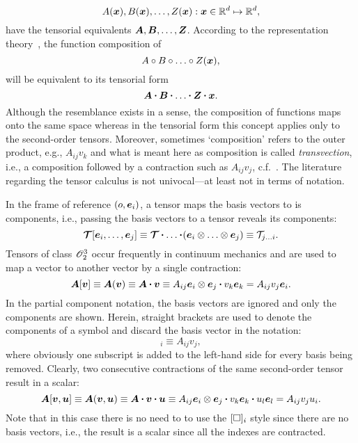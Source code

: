 \begin{equation}
A(\tena{x}), B(\tena{x}),\ldots, Z(\tena{x}): \tena{x}\in\Real^d \mapsto \Real^d,
\end{equation}
have the tensorial equivalents $\tenb{A}, \tenb{B},\ldots,\tenb{Z}$. According to the representation theory~\autocite{Brannon.2017}, the function composition of
\begin{equation}
A\circ B\circ \ldots \circ Z(\tena{x}),
\end{equation}
will be equivalent to its tensorial form
\begin{equation}
\tenb{A}\scp \tenb{B}\scp \ldots \scp \tenb{Z}\scp \tena{x}.
\end{equation}
Although the resemblance exists in a sense, the composition of functions maps onto the same space whereas in the tensorial form this concept applies only to the second-order tensors. Moreover, sometimes `composition' refers to the outer product, e.g., $A_{ij}v_k$ and what is meant here as composition is called \textit{transvection}, i.e., a composition followed by a contraction such as $A_{ij}v_j$, c.f.~\autocite{Jaunzemis.1967,Haupt.2002}. The literature regarding the tensor calculus is not univocal---at least not in terms of notation.

\red
In the frame of reference $(o,\base_i)$, a tensor maps the basis vectors to is components, i.e., passing the basis vectors to a tensor reveals its components:
\begin{equation}
\ten{T}[\base_i,\ldots,\base_j]\equiv \ten{T}\scp\ldots\scp (\base_i \dyad \ldots \dyad \base_j) \equiv \mathcal{T}_{j\ldots i}.
\end{equation}
Tensors of class $\mathscr{O}_{2}^{3}$ occur frequently in continuum mechanics and are used to map a vector to another vector by a single contraction:
\begin{equation}
\tenb{A}[\tena{v}]\equiv \tenb{A}(\tena{v}) \equiv \tenb{A} \scp \tena{v} \equiv A_{ij}\base_i\dyad\base_j\scp v_k\base_k = A_{ij}v_j \base_i.
\end{equation}
In the partial component notation, the basis vectors are ignored and only the components are shown. Herein, straight brackets are used to denote the components of a symbol and discard the basis vector in the notation:
\begin{equation}
[\tenb{A} \scp \tena{v}]_i \equiv A_{ij}v_j,
\end{equation}
where obviously one subscript is added to the left-hand side for every basis being removed. Clearly, two consecutive contractions of the same second-order tensor result in a scalar:
\begin{equation}
\tenb{A}[\tena{v},\tena{u}]\equiv \tenb{A}(\tena{v},\tena{u}) \equiv \tenb{A} \scp \tena{v} \scp \tena{u}\equiv A_{ij}\base_i\dyad\base_j\scp v_k\base_k \scp u_l\base_l = A_{ij}v_ju_i.
\end{equation}
Note that in this case there is no need to to use the $[\square]_i$ style since there are no basis vectors, i.e., the result is a scalar since all the indexes are contracted.
\bl




